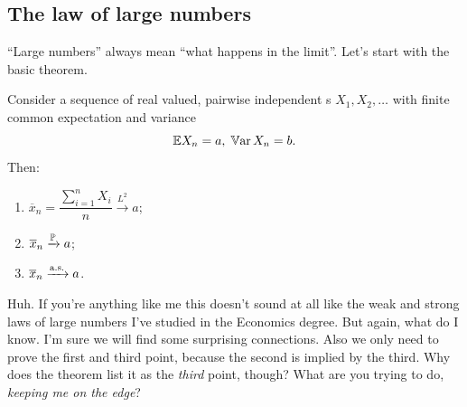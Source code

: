 \documentclass{report}
\begin{document}
\subsection{The law of large numbers}
``Large numbers'' always mean ``what happens in the limit''. Let's start with the basic theorem.
\begin{theorem}
	Consider a sequence of real valued, pairwise independent \rv s $X_1,X_2,\ldots$ with finite common expectation and variance
	\[\mathbb{E} X_n=a,\;\mathbb{V}\mathrm{ar}\, X_n=b.\]
	Then:
	\begin{enumerate}[\circnum]
		\item $\overline{x}_{n}=\dfrac{\sum_{i=1}^{n}X_i}{n}\xrightarrow[]{L^{2}}a$;
		\item $\overline{x}_{n}\xrightarrow[]{\mathbb{P}} a$;
		\item $\overline{x}_{n}\xrightarrow[]{\text{a.s.}} a$.
	\end{enumerate}
\end{theorem}
Huh. If you're anything like me this doesn't sound at all like the weak and strong laws of large numbers I've studied in the Economics degree. But again, what do I know. I'm sure we will find some surprising connections. Also we only need to prove the first and third point, because the second is implied by the third. Why does the theorem list it as the \textit{third} point, though? What are you trying to do, \textit{keeping me on the edge}?
\end{document}
